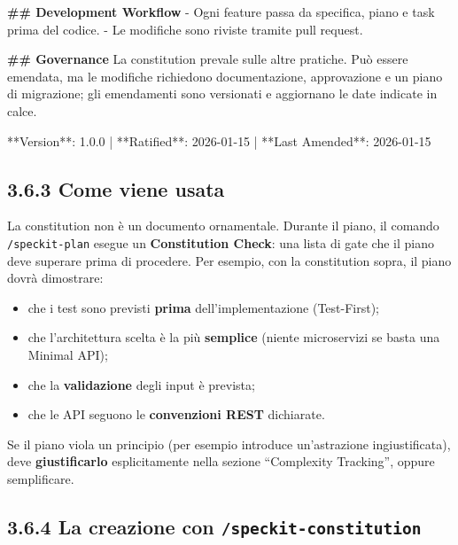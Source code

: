 \documentclass[
  italian,
  10pt,
]{book}
\newenvironment{Shaded}{\begin{snugshade}}{\end{snugshade}}
\newcommand{\FunctionTok}[1]{\textcolor[rgb]{0.13,0.29,0.53}{\textbf{#1}}}
\newcommand{\NormalTok}[1]{#1}
\newcommand{\SpecialStringTok}[1]{\textcolor[rgb]{0.31,0.60,0.02}{#1}}
\providecommand{\tightlist}{%
  \setlength{\itemsep}{0pt}\setlength{\parskip}{0pt}}
\begin{document}
\begin{Shaded}
\begin{Highlighting}[]
\FunctionTok{\#\# Development Workflow}
\SpecialStringTok{{-} }\NormalTok{Ogni feature passa da specifica, piano e task prima del codice.}
\SpecialStringTok{{-} }\NormalTok{Le modifiche sono riviste tramite pull request.}

\FunctionTok{\#\# Governance}
\NormalTok{La constitution prevale sulle altre pratiche. Può essere emendata, ma le}
\NormalTok{modifiche richiedono documentazione, approvazione e un piano di migrazione;}
\NormalTok{gli emendamenti sono versionati e aggiornano le date indicate in calce.}

\NormalTok{**Version**: 1.0.0 | **Ratified**: 2026{-}01{-}15 | **Last Amended**: 2026{-}01{-}15}
\end{Highlighting}
\end{Shaded}

\subsection{3.6.3 Come viene usata}\label{come-viene-usata}

La constitution non è un documento ornamentale. Durante il piano, il
comando \texttt{/speckit-plan} esegue un \textbf{Constitution Check}:
una lista di gate che il piano deve superare prima di procedere. Per
esempio, con la constitution sopra, il piano dovrà dimostrare:

\begin{itemize}
\tightlist
\item
  che i test sono previsti \textbf{prima} dell'implementazione
  (Test-First);
\item
  che l'architettura scelta è la più \textbf{semplice} (niente
  microservizi se basta una Minimal API);
\item
  che la \textbf{validazione} degli input è prevista;
\item
  che le API seguono le \textbf{convenzioni REST} dichiarate.
\end{itemize}

Se il piano viola un principio (per esempio introduce un'astrazione
ingiustificata), deve \textbf{giustificarlo} esplicitamente nella
sezione ``Complexity Tracking'', oppure semplificare.

\subsection{\texorpdfstring{3.6.4 La creazione con
\texttt{/speckit-constitution}}{3.6.4 La creazione con /speckit-constitution}}\label{la-creazione-con-speckit-constitution}
\end{document}
